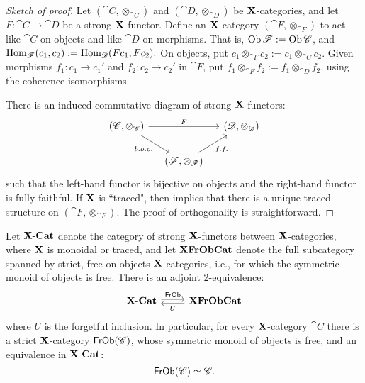 \documentclass[12pt,oneside,article,draft]{memoir}
\begin{document}
\begin{proof}[Sketch of proof]

Let $(\cat{C},\otimes_{\cat{C}})$ and $(\cat{D},\otimes_{\cat{D}})$ be $\mathbf{X}$-categories, and let $F\colon\cat{C}\to\cat{D}$ be a strong $\mathbf{X}$-functor. Define an $\mathbf{X}$-category $(\cat{F},\otimes_{\cat{F}})$ to act like $\cat{C}$ on objects and like $\cat{D}$ on morphisms. That is, $\operatorname{Ob}\mathscr{F}:=\operatorname{Ob}\mathscr{C}$, and $\operatorname{Hom}_{\mathscr{F}}(c_1,c_2):=\operatorname{Hom}_{\mathscr{D}}(Fc_1,Fc_2).$ On objects, put $c_1\otimes_{\cat{F}}c_2:=c_1\otimes_{\cat{C}}c_2$. Given morphisms $f_1\colon c_1\to c_1'$ and $f_2\colon c_2\to c_2'$ in $\cat{F}$, put $f_1\otimes_{\cat{F}}f_2:=f_1\otimes_{\cat{D}}f_2$, using the coherence isomorphisms.

There is an induced commutative diagram of strong $\mathbf{X}$-functors:
$$
\begin{tikzcd}[column sep=small]
(\cat{C},\otimes_{\cat{C}})\arrow[dr, "b.o.o."']\arrow[rr, "F"]&&(\cat{D},\otimes_{\cat{D}})\\
&(\cat{F},\otimes_{\cat{F}})\arrow[ur,"f.f."']
\end{tikzcd}
$$
such that the left-hand functor is bijective on objects and the right-hand functor is fully faithful. If $\mathbf{X}$ is ``traced", then \cite[Proposition 2.4]{Joyal-Street-Vertity} implies that there is a unique traced structure on $(\cat{F},\otimes_{\cat{F}})$. The proof of orthogonality is straightforward.

\end{proof}

\begin{proposition}\label{prop:free objects}

Let $\textnormal{$\mathbf{X}$-$\mathbf{Cat}$}$ denote the category of strong $\mathbf{X}$-functors between $\mathbf{X}$-categories,  where $\mathbf{X}$ is monoidal or traced, and let $\mathbf{XFrObCat}$ denote the full subcategory spanned by strict, free-on-objects $\mathbf{X}$-categories, i.e., for which the symmetric monoid of objects is free. There is an adjoint 2-equivalence:
$$
\begin{tikzcd}
\XCat\arrow[r, shift left=.5ex, "\Fun{FrOb}"]&\Cat{XFrObCat}\arrow[l, shift left=.5ex,"U"]
\end{tikzcd}
$$
where $U$ is the forgetful inclusion. In particular, for every $\mathbf{X}$-category $\cat{C}$ there is a strict $\mathbf{X}$-category $\mathsf{FrOb}(\mathscr{C})$, whose symmetric monoid of objects is free, and an equivalence in $\textnormal{$\mathbf{X}$-$\mathbf{Cat}$}$:
$$\mathsf{FrOb}(\mathscr{C})\simeq\mathscr{C}.$$

\end{proposition}
\end{document}
